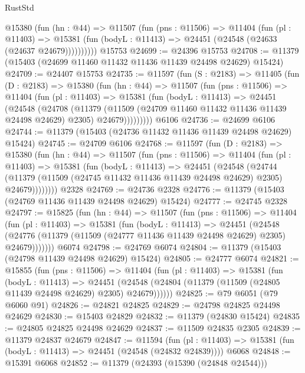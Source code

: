 \begin{lexlean}{RustStd}
\begin{coremodule}
        @15380
          (fun (hn : @44) =>
          @11507
            (fun (pns : @11506) =>
            @11404
              (fun (pl : @11403) =>
              @15381 (fun (bodyL : @11413) => @24451 (@24548 (@24633 (@24637 @24679))))))))))
    @15753
@24699 := @24396 @15753
@24708 := @11379 (@15403 (@24699 @11460 @11432 @11436 @11439 @24498 @24629) @15424)
@24709 := @24407 @15753
@24735 := @11597
    (fun (S : @2183) =>
    @11405
      (fun (D : @2183) =>
      @15380
        (fun (hn : @44) =>
        @11507
          (fun (pns : @11506) =>
          @11404
            (fun (pl : @11403) =>
            @15381
              (fun (bodyL : @11413) =>
              @24451
                (@24548
                  (@24708
                    (@11379
                      (@11509 (@24709 @11460 @11432 @11436 @11439 @24498 @24629) @2305)
                      @24679)))))))))
    @6106
@24736 := @24699 @6106
@24744 := @11379 (@15403 (@24736 @11432 @11436 @11439 @24498 @24629) @15424)
@24745 := @24709 @6106
@24768 := @11597
    (fun (D : @2183) =>
    @15380
      (fun (hn : @44) =>
      @11507
        (fun (pns : @11506) =>
        @11404
          (fun (pl : @11403) =>
          @15381
            (fun (bodyL : @11413) =>
            @24451
              (@24548
                (@24744
                  (@11379 (@11509 (@24745 @11432 @11436 @11439 @24498 @24629) @2305) @24679))))))))
    @2328
@24769 := @24736 @2328
@24776 := @11379 (@15403 (@24769 @11436 @11439 @24498 @24629) @15424)
@24777 := @24745 @2328
@24797 := @15825
    (fun (hn : @44) =>
    @11507
      (fun (pns : @11506) =>
      @11404
        (fun (pl : @11403) =>
        @15381
          (fun (bodyL : @11413) =>
          @24451
            (@24548
              (@24776 (@11379 (@11509 (@24777 @11436 @11439 @24498 @24629) @2305) @24679)))))))
    @6074
@24798 := @24769 @6074
@24804 := @11379 (@15403 (@24798 @11439 @24498 @24629) @15424)
@24805 := @24777 @6074
@24821 := @15855
    (fun (pns : @11506) =>
    @11404
      (fun (pl : @11403) =>
      @15381
        (fun (bodyL : @11413) =>
        @24451 (@24548 (@24804 (@11379 (@11509 (@24805 @11439 @24498 @24629) @2305) @24679))))))
@24825 := @79 @6051 (@79 @6060 @91)
@24826 := @24821 @24825
@24829 := @24798 @24825 @24498 @24629
@24830 := @15403 @24829
@24832 := @11379 (@24830 @15424)
@24835 := @24805 @24825 @24498 @24629
@24837 := @11509 @24835 @2305
@24839 := @11379 @24837 @24679
@24847 := @11594
    (fun (pl : @11403) => @15381 (fun (bodyL : @11413) => @24451 (@24548 (@24832 @24839))))
    @6068
@24848 := @15391 @6068
@24852 := @11379 (@24393 (@15390 (@24848 @24544)))

\end{coremodule}
\end{lexlean}
